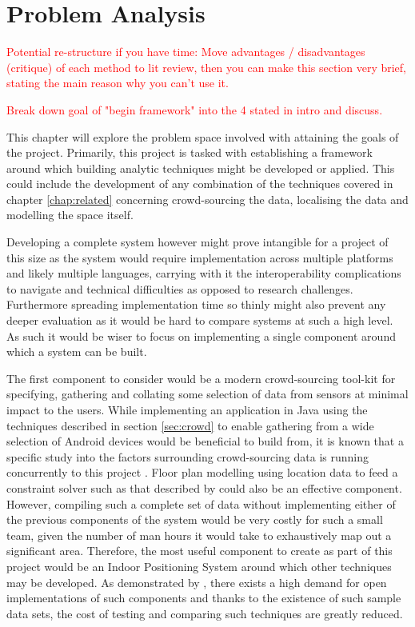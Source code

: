 \documentclass{UoYCSproject}
\begin{document}
    \chapter{Problem Analysis}
    
	    \textcolor{red}{Potential re-structure if you have time: Move advantages / disadvantages (critique) of each method to lit review, then you can make this section very brief, stating the main reason why you can't use it.}
	    
	    \textcolor{red}{Break down goal of "begin framework" into the 4 stated in intro and discuss.}
    
        This chapter will explore the problem space involved with attaining the goals of the project. Primarily, this project is tasked with establishing a framework around which building analytic techniques might be developed or applied. This could include the development of any combination of the techniques covered in chapter \ref{chap:related} concerning crowd-sourcing the data, localising the data and modelling the space itself.
        
        Developing a complete system however might prove intangible for a project of this size as the system would require implementation across multiple platforms and likely multiple languages, carrying with it the interoperability complications to navigate and technical difficulties as opposed to research challenges. Furthermore spreading implementation time so thinly might also prevent any deeper evaluation as it would be hard to compare systems at such a high level. As such it would be wiser to focus on implementing a single component around which a system can be built.
        
        The first component to consider would be a modern crowd-sourcing tool-kit for specifying, gathering and collating some selection of data from sensors at minimal impact to the users. While implementing an application in Java using the techniques described in section \ref{sec:crowd} to enable gathering from a wide selection of Android devices would be beneficial to build from, it is known that a specific study into the factors surrounding crowd-sourcing data is running concurrently to this project \citep{IainBate}. Floor plan modelling using location data to feed a constraint solver such as that described by \citet{charman1994constraint} could also be an effective component. However, compiling such a complete set of data without implementing either of the previous components of the system would be very costly for such a small team, given the number of man hours it would take to exhaustively map out a significant area. Therefore, the most useful component to create as part of this project would be an Indoor Positioning System around which other techniques may be developed. As demonstrated by \citet{torres2014ujiindoorloc}, there exists a high demand for open implementations of such components and thanks to the existence of such sample data sets, the cost of testing and comparing such techniques are greatly reduced.
        
\end{document}

